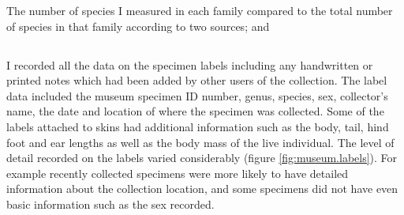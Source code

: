 
\begin{table}[h]
	\caption[Summary of species measured] 
	{The number of species I measured in each family compared to the total number of species in that family according to two sources; \citep{Wilson2005} and \citep{IUCN2012}}
	
	\label{tab:species.measured}
\end{table}






\subsection{}

	I recorded all the data on the specimen labels including any handwritten or printed notes which had been added by other users of the collection. The label data included the museum specimen ID number, genus, species, sex, collector’s name, the date and location of where the specimen was collected. Some of the labels attached to skins had additional information such as the body, tail, hind foot and ear lengths as well as the body mass of the live individual. 
	The level of detail recorded on the labels varied considerably (figure \ref{fig:museum.labels}). For example recently collected specimens were more likely to have detailed information about the collection location, and some specimens did not have even basic information such as the sex recorded. 

